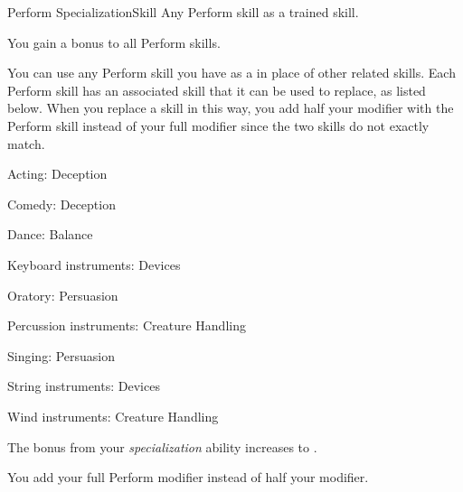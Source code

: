   \begin{feat}{Perform Specialization}{Skill}
    \featpre Any Perform skill as a trained skill.

     You gain a  bonus to all Perform skills.

     You can use any Perform skill you have as a  in place of other related skills.
    Each Perform skill has an associated skill that it can be used to replace, as listed below.
    When you replace a skill in this way, you add half your modifier with the Perform skill instead of your full modifier since the two skills do not exactly match.
    \begin{raggeditemize}
      \item Acting: Deception
      \item Comedy: Deception
      \item Dance: Balance
      \item Keyboard instruments: Devices
      \item Oratory: Persuasion
      \item Percussion instruments: Creature Handling
      \item Singing: Persuasion
      \item String instruments: Devices
      \item Wind instruments: Creature Handling
    \end{raggeditemize}

     The bonus from your \textit{specialization} ability increases to .

     You add your full Perform modifier instead of half your modifier.
  \end{feat}

